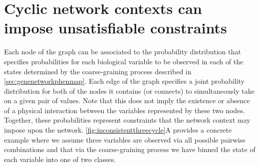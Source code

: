 \section{Cyclic network contexts can impose unsatisfiable constraints}\label{sec:cycliccontextunsatisfiableconstraints}


Each node of the \SH{} graph can be associated to the probability distribution that specifies probabilities for each biological variable to be observed in each of the states determined by the coarse-graining process described in \ref{sec:genenetworkphenmap}. Each edge of the graph specifies a joint probability distribution for both of the nodes it contains (or connects) to simultaneously take on a given pair of values. Note that this does not imply the existence or absence of a physical interaction between the variables represented by these two nodes. Together, these probabilities represent constraints that the network context may impose upon the network.
\ref{fig:inconsistentthreecycle}A provides a concrete example where we assume three variables are observed via all possible pairwise combinations and that via the coarse-graining process we have binned the state of each variable into one of two classes.
